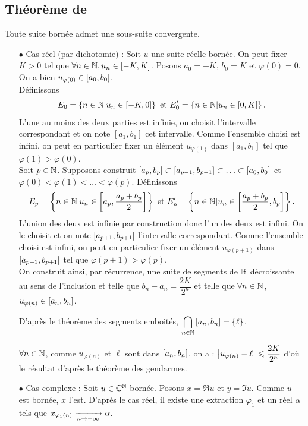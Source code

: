 \documentclass{magnolia}
\begin{document}
\subsection{Théorème de }

\begin{theoreme}[nom={Théorème de \nom{Bolzano-Weierstrass}}]
Toute suite bornée admet une sous-suite convergente.
\end{theoreme}

\begin{preuve}
\begin{itemize}
\item[$\bullet$] \underline{Cas réel (par dichotomie) :} Soit $u$ une suite réelle bornée. On peut fixer $K>0$ tel que $\forall n\in \mathbb{N}, u_n\in \left[-K,K\right]$. Posons $a_0=-K$, $b_0=K$ et $\varphi(0)=0$. On a bien $u_{\varphi(0)}\in \left[a_0,b_0\right]$.\\
Définissons \[E_0=\left\{n\in\mathbb{N} | u_n \in \left[-K,0\right]\right\} \text{ et } E'_0=\left\{n\in\mathbb{N} | u_n \in \left[0,K\right]\right\}.\] L'une au moins des deux parties est infinie, on choisit l'intervalle correspondant et on note $[a_1,b_1]$ cet intervalle. Comme l'ensemble choisi est infini, on peut en particulier fixer un élément $u_{\varphi(1)}$ dans $[a_1,b_1]$ tel que $\varphi(1)>\varphi(0)$.\\
Soit $p\in \mathbb{N}$. Supposons construit $\left[a_p,b_p\right] \subset\left[a_{p-1},b_{p-1}\right]\subset\ldots\subset\left[a_0,b_0\right]$ et $\varphi(0)<\varphi(1)<\ldots<\varphi(p)$. Définissons \[E_p=\left\{n\in\mathbb{N} | u_n \in \left[a_p,\frac{a_p+b_p}{2}\right]\right\} \text{ et } E'_p=\left\{n\in\mathbb{N} | u_n \in \left[\frac{a_p+b_p}{2},b_p\right]\right\}.\]
L'union des deux est infinie par construction donc l'un des deux est infini. On le choisit et on note $\left[a_{p+1},b_{p+1}\right]$ l'intervalle correspondant. Comme l'ensemble choisi est infini, on peut en particulier fixer un élément $u_{\varphi(p+1)}$ dans $\left[a_{p+1},b_{p+1}\right]$ tel que $\varphi(p+1)>\varphi(p)$.\\

On construit ainsi, par récurrence, une suite de segments de $\mathbb{R}$ décroissante au sens de l'inclusion et telle que $b_n-a_n=\dfrac{2K}{2^n}$ et telle que $\forall n\in \mathbb{N}$, $u_{\varphi(n)}\in \left[a_n,b_n\right]$.

D'après le théorème des segments emboités, $\displaystyle \bigcap_{n\in \mathbb{N}}\left[a_n,b_n\right]=\left\{\ell\right\}$.

$\forall n\in \mathbb{N}$, comme $u_{\varphi(n)}$ et $\ell$ sont dans $\left[a_n,b_n\right]$, on a : $\left|u_{\varphi(n)}-\ell\right|\leqslant \dfrac{2K}{2^n}$ d'où le résultat d'après le théorème des gendarmes.
\item[$\bullet$] \underline{Cas complexe :} Soit $u\in\mathbb{C}^{\mathbb{N}}$ bornée. Posons $x=\Re u$ et $y=\Im u$. Comme $u$ est bornée, $x$ l'est. D'après le cas réel, il existe une extraction $\varphi_1$ et un réel $\alpha$ tels que $x_{\varphi_1(n)}\xrightarrow[n\rightarrow +\infty]{}\alpha$.


\end{itemize}
\end{preuve}
\end{document}
